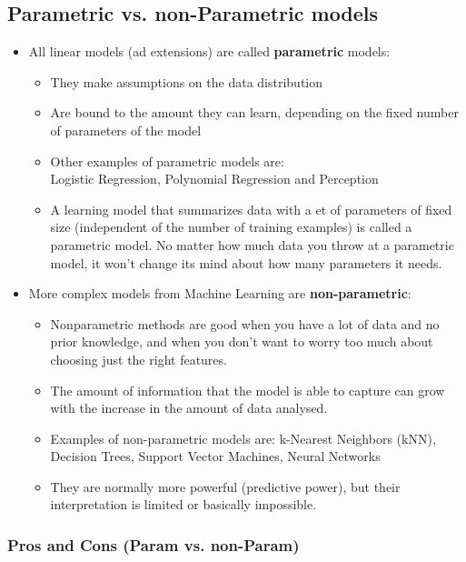 \documentclass[a4paper]{article}
\begin{document}
		\subsection{Parametric vs. non-Parametric models}
		
		\begin{itemize}
			\item All linear models (ad extensions) are called \textbf{parametric} models:
				\begin{itemize}
					\item They make assumptions on the data distribution
					\item Are bound to the amount they can learn, depending on the fixed number of parameters of the model
					\item Other examples of parametric models are: \\
					Logistic Regression, Polynomial Regression and Perception
					\item A learning model that summarizes data with a et of parameters of fixed size (independent of the number of training examples) is called a parametric model.
					No matter how much data you throw at a parametric model, it won't change its mind about how many parameters it needs.
				\end{itemize}
			\item More complex models from Machine Learning are \textbf{non-parametric}:
				\begin{itemize}
					\item Nonparametric methods are good when you have a lot of data and no prior knowledge, 
						and when you don't want to worry too much about choosing just the right features.
					\item The amount of information that the model is able to capture can grow with the increase in the amount of data analysed.
					\item Examples of non-parametric models are: k-Nearest Neighbors (kNN), Decision Trees, Support Vector Machines, Neural Networks
					\item They are normally more powerful (predictive power), but their interpretation is limited or basically impossible.
				\end{itemize}
		\end{itemize}
			
			\newpage
				
			\subsubsection{Pros and Cons (Param vs. non-Param)}
			
\end{document}
